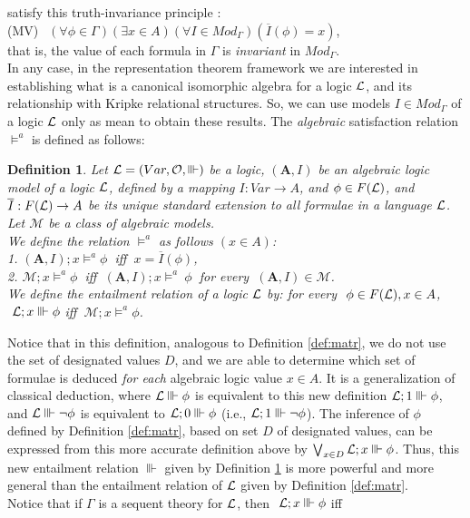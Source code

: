 \documentclass[10pt,twocolumn]{article}
\newcommand{\M}{\mathcal{M}} \newcommand{\N}{\mathcal{N}}
\renewcommand{\O}{\mathcal{O}} \renewcommand{\P}{\mathcal{P}}
\newtheorem{definition}{Definition}
\begin{document}
satisfy
this truth-invariance principle \cite{Majk09BS}: \\
(MV) $~~(\forall \phi \in \Gamma)(\exists x \in A)(\forall I \in
Mod_{\Gamma})(\overline{I}(\phi) = x)$,\\ that is, the value of each
formula in
$\Gamma$ is \emph{invariant} in $Mod_{\Gamma}$. \\
In any case, in the representation theorem framework we are
interested in establishing what is a canonical isomorphic algebra
for a logic $\mathcal{L}$, and its relationship with Kripke relational
structures. So, we can use models $I \in Mod_{\Gamma}$ of a logic
$\mathcal{L}$ only as mean to obtain these results.
 The \emph{algebraic} satisfaction relation
$\models^a$ is defined as follows:
\begin{definition} \label{def:newalg} Let $\L = (Var, \O,
\Vvdash)$ be a logic, $(\textbf{A},I)$ be an algebraic logic model
of a logic $\mathcal{L}$, defined by a mapping $I:Var \rightarrow A$, and
$\phi \in F(\mathcal{L})$, and $\overline{I}:F(\mathcal{L}) \rightarrow A$ be its
unique standard extension to all formulae in a language $\mathcal{L}$. Let
$\M$ be a class of algebraic models.\\ We define the
relation $\models^a$ as follows $(x \in A)$:\\
1. $(\textbf{A},I);x\models^a\phi~$ iff $~x = \overline{I}(\phi)$,\\
2. $\M;x \models^a\phi~$ iff $~(\textbf{A},I);x\models^a~\phi~$
for every $~(\textbf{A},I) \in \M$.\\
We define the entailment relation of a logic $\mathcal{L}$ by:  for every
$~\phi \in F(\mathcal{L}), x \in A$,
 $~\mathcal{L};x \Vvdash \phi$ iff $~\M;x \models^a\phi$.
\end{definition}
Notice that in this definition, analogous to Definition
\ref{def:matr}, we do not use the set of designated values $D$, and
we are able to determine which set of formulae is deduced \emph{for
each} algebraic logic value $x \in A$. It is a generalization of
classical deduction, where $\mathcal{L} \Vvdash \phi$ is equivalent to this
new definition $\mathcal{L};1 \Vvdash \phi$, and $\mathcal{L} \Vvdash \neg\phi$ is
equivalent to $\mathcal{L};0 \Vvdash \phi$ (i.e., $\mathcal{L};1 \Vvdash \neg\phi$).
The inference  of $\phi$ defined by Definition \ref{def:matr}, based
on set $D$ of designated values, can be expressed from this more
accurate definition above by  $\bigvee_{x \in D} \mathcal{L};x \Vvdash \phi$.
Thus, this new entailment relation $\Vvdash$ given by Definition
\ref{def:newalg} is more powerful and more general than the
entailment relation of $\mathcal{L}$ given by Definition \ref{def:matr}.
\\Notice that if $\Gamma$ is a sequent theory for $\mathcal{L}$, then $~\mathcal{L};x \Vvdash \phi$ iff
\end{document}
